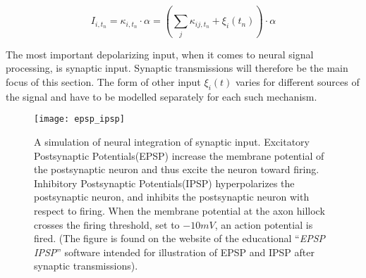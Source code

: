		\begin{equation}
			I_{i, t_n} = \kappa_{i,t_n} \cdot \alpha = \left( \sum_{j} \kappa_{ij, t_n} + \xi_i(t_n) \right) \cdot \alpha
			\label{eqSynapticIntegrationForKANN}
		\end{equation}

	The most important depolarizing input, when it comes to neural signal processing, is synaptic input\cite{PrinciplesOfNeuralScience4edKAP10}.
	Synaptic transmissions will therefore be the main focus of this section.
	The form of other input $\xi_i(t)$ varies for different sources of the signal and have to be modelled separately for each such mechanism. 

\begin{figure}[hbt!p]
	\centering
	\texttt{[image: epsp\_ipsp]}
	\caption{A simulation of neural integration of synaptic input. 
			Excitatory Postsynaptic Potentials(EPSP) increase the membrane potential of the postsynaptic neuron and thus excite the neuron toward firing.
			Inhibitory Postsynaptic Potentials(IPSP) hyperpolarizes the postsynaptic neuron, and inhibits the postsynaptic neuron with respect to firing.
			When the membrane potential at the axon hillock crosses the firing threshold, set to $-10mV$, an action potential is fired.
			(The figure is found on the website of the educational ``\emph{EPSP IPSP}'' software intended for illustration of EPSP and IPSP after synaptic transmissions).
				}
	\label{figFigurAvNeuronet}
\end{figure}


